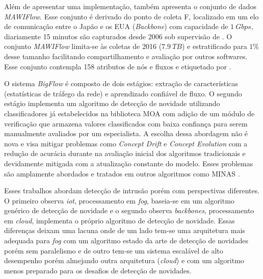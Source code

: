 Além de apresentar uma implementação,  também apresenta o
conjunto de dados \emph{MAWIFlow}. Esse conjunto é derivado do ponto de coleta
F, localizado em um elo de comunicação entre o Japão e os EUA (\emph{Backbone})
com capacidade de $1\ Gbps$, diariamente 15 minutos são capturados desde 2006
sob supervisão de  \cite{Fontugne2010}. O conjunto
\emph{MAWIFlow} limita-se às coletas de 2016 ($7.9\ TB$) e estratificado para
$1\%$ desse tamanho facilitando compartilhamento e avaliação por outros
softwares. Esse conjunto contempla 158 atributos de nós e fluxos e etiquetado
por .

O sistema \emph{BigFlow} é composto de dois estágios: extração de
características (estatísticas de tráfego da rede) e aprendizado confiável de
fluxo. O segundo estágio implementa um algoritmo de detecção de novidade
utilizando classificadores já estabelecidos na biblioteca MOA \cite{MOA} com
adição de um módulo de verificação que armazena valores classificados com baixa
confiança para serem manualmente avaliados por um especialista. A escolha dessa
abordagem não é nova e visa mitigar problemas como \emph{Concept Drift} e
\emph{Concept Evolution} \cite{Faria2016nd} com a redução de acurácia durante na
avaliação inicial dos algoritmos tradicionais e devidamente mitigada com a
atualização constante do modelo. Esses problemas são amplamente abordados e
tratados em outros algoritmos como MINAS \cite{Faria2016minas}.

Esses trabalhos abordam detecção de intrusão porém com perspectivas diferentes.
O primeiro observa \emph{iot}, processamento em \emph{fog}, baseia-se em um
algoritmo genérico de detecção de novidade e o segundo observa \emph{backbones},
processamento em \emph{cloud}, implementa o próprio algoritmo de detecção de
novidade. Essas diferenças deixam uma lacuna onde de um lado tem-se uma
arquitetura mais adequada para \emph{fog} com um algoritmo estado da arte de
detecção de novidades porém sem paralelismo e de outro tem-se um sistema
escalável de alto desempenho porém almejando outra arquitetura (\emph{cloud}) e
com um algoritmo menos preparado para os desafios de detecção de novidades.


